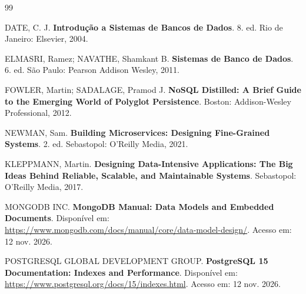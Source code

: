\documentclass[12pt,a4paper]{report}
\begin{document}
\begin{thebibliography}{99}

DATE, C. J. \textbf{Introdução a Sistemas de Bancos de Dados}. 8. ed. Rio de Janeiro: Elsevier, 2004.

ELMASRI, Ramez; NAVATHE, Shamkant B. \textbf{Sistemas de Banco de Dados}. 6. ed. São Paulo: Pearson Addison Wesley, 2011.

FOWLER, Martin; SADALAGE, Pramod J. \textbf{NoSQL Distilled: A Brief Guide to the Emerging World of Polyglot Persistence}. Boston: Addison-Wesley Professional, 2012.

NEWMAN, Sam. \textbf{Building Microservices: Designing Fine-Grained Systems}. 2. ed. Sebastopol: O'Reilly Media, 2021.

KLEPPMANN, Martin. \textbf{Designing Data-Intensive Applications: The Big Ideas Behind Reliable, Scalable, and Maintainable Systems}. Sebastopol: O'Reilly Media, 2017.

MONGODB INC. \textbf{MongoDB Manual: Data Models and Embedded Documents}. Disponível em: \url{https://www.mongodb.com/docs/manual/core/data-model-design/}. Acesso em: 12 nov. 2026.

POSTGRESQL GLOBAL DEVELOPMENT GROUP. \textbf{PostgreSQL 15 Documentation: Indexes and Performance}. Disponível em: \url{https://www.postgresql.org/docs/15/indexes.html}. Acesso em: 12 nov. 2026.

\end{thebibliography}
\end{document}
